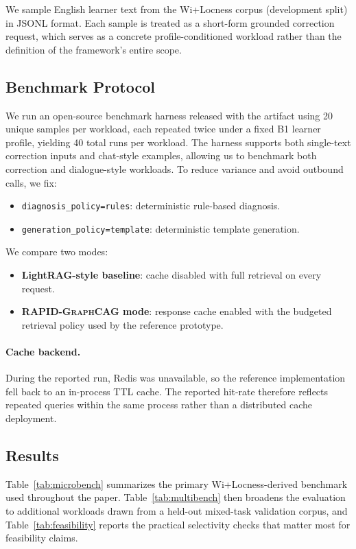 \documentclass[11pt,a4paper,twocolumn]{article}
\newcommand{\rapid}{\textsc{RAPID-GraphCAG}}
\begin{document}
We sample English learner text from the Wi+Locness corpus (development split) in JSONL format. Each sample is treated as a short-form grounded correction request, which serves as a concrete profile-conditioned workload rather than the definition of the framework's entire scope.

\subsection{Benchmark Protocol}

We run an open-source benchmark harness released with the artifact using 20 unique samples per workload, each repeated twice under a fixed B1 learner profile, yielding 40 total runs per workload. The harness supports both single-text correction inputs and chat-style examples, allowing us to benchmark both correction and dialogue-style workloads. To reduce variance and avoid outbound calls, we fix:
\begin{itemize}[leftmargin=*]
  \item \texttt{diagnosis\_policy=rules}: deterministic rule-based diagnosis.
  \item \texttt{generation\_policy=template}: deterministic template generation.
\end{itemize}

We compare two modes:
\begin{itemize}[leftmargin=*]
  \item \textbf{LightRAG-style baseline}: cache disabled with full retrieval on every request.
  \item \textbf{\rapid{} mode}: response cache enabled with the budgeted retrieval policy used by the reference prototype.
\end{itemize}

\paragraph{Cache backend.} During the reported run, Redis was unavailable, so the reference implementation fell back to an in-process TTL cache. The reported hit-rate therefore reflects repeated queries within the same process rather than a distributed cache deployment.

\subsection{Results}

Table~\ref{tab:microbench} summarizes the primary Wi+Locness-derived benchmark used throughout the paper. Table~\ref{tab:multibench} then broadens the evaluation to additional workloads drawn from a held-out mixed-task validation corpus, and Table~\ref{tab:feasibility} reports the practical selectivity checks that matter most for feasibility claims.
\end{document}
